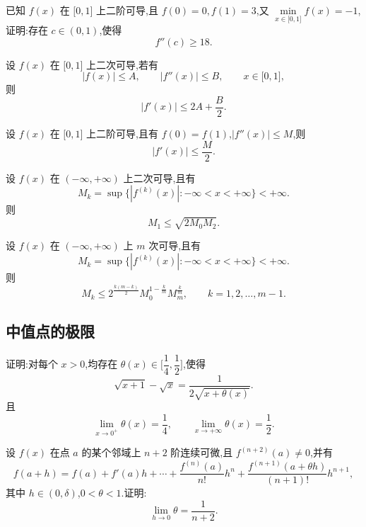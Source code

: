 \documentclass[../../数学分析培优讲义.tex]{subfiles}
\begin{document}
\begin{example}
已知 $f(x)$ 在 $\lbrack 0,1\rbrack$ 上二阶可导,且 $f(0)=0,f(1)=3$,又
$\displaystyle\min\limits_{x\in\lbrack 0,1\rbrack}f(x)=-1$,证明:存在 $c\in(0,1)$,使得
\[
    f''(c)\geq18.
\]
\end{example}
\exampleblank

\begin{example}[\markstar]
设 $f(x)$ 在 $\lbrack 0,1\rbrack$ 上二次可导,若有
\[
    |f(x)|\leq A,\qquad |f''(x)|\leq B,\qquad x\in\lbrack 0,1\rbrack,
\]
则
\[
    |f'(x)|\leq2A+\dfrac{B}{2}.
\]
\end{example}
\exampleblank

\begin{example}
设 $f(x)$ 在 $\lbrack 0,1\rbrack$ 上二阶可导,且有 $f(0)=f(1)$,$|f''(x)|\leq M$,则
\[
    |f'(x)|\leq\dfrac{M}{2}.
\]
\end{example}
\exampleblank

\begin{example}[\markstar]
设 $f(x)$ 在 $(-\infty,+\infty)$ 上二次可导,且有
\[
    M_k=\sup\{|f^{(k)}(x)|:-\infty<x<+\infty\}<+\infty.
\]
则
\[
    M_1\leq\sqrt{2M_0M_2}.
\]
\end{example}
\exampleblank

\begin{example}[\markstar]
设 $f(x)$ 在 $(-\infty,+\infty)$ 上 $m$ 次可导,且有
\[
    M_k=\sup\{|f^{(k)}(x)|:-\infty<x<+\infty\}<+\infty.
\]
则
\[
    M_k\leq2^{\frac{k(m-k)}{2}}M_0^{1-\frac{k}{m}}M_m^{\frac{k}{m}},
    \qquad k=1,2,\ldots,m-1.
\]
\end{example}
\exampleblank



\subsection{中值点的极限}

\begin{example}
证明:对每个 $x>0$,均存在 $\theta(x)\in\lbrack \dfrac{1}{4},\dfrac{1}{2}\rbrack$,使得
\[
    \sqrt{x+1}-\sqrt{x}=\dfrac{1}{2\sqrt{x+\theta(x)}}.
\]
且
\[
    \lim\limits_{x\to0^+}\theta(x)=\dfrac{1}{4},
    \qquad
    \lim\limits_{x\to+\infty}\theta(x)=\dfrac{1}{2}.
\]
\end{example}
\exampleblank

\begin{example}
设 $f(x)$ 在点 $a$ 的某个邻域上 $n+2$ 阶连续可微,且 $f^{(n+2)}(a)\neq0$,并有
\[
    f(a+h)=f(a)+f'(a)h+\cdots+\dfrac{f^{(n)}(a)}{n!}h^n
    +\dfrac{f^{(n+1)}(a+\theta h)}{(n+1)!}h^{n+1},
\]
其中 $h\in(0,\delta)$,$0<\theta<1$.证明:
\[
    \lim\limits_{h\to0}\theta=\dfrac{1}{n+2}.
\]
\end{example}
\exampleblank
\end{document}
